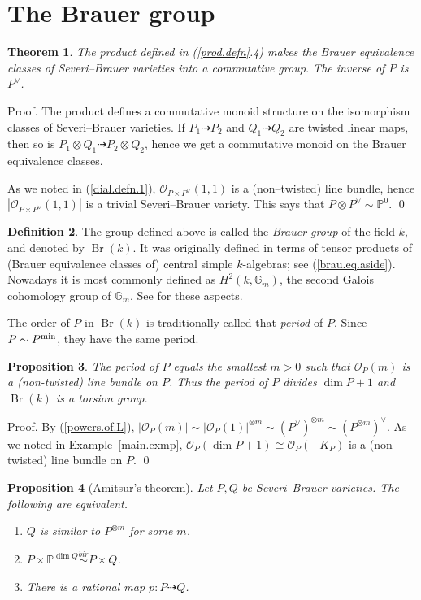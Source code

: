 \documentclass{amsart}
\newtheorem{thm}{Theorem}%
\newtheorem{prop}[thm]{Proposition}
\theoremstyle{definition}
\newtheorem{defn}[thm]{Definition}
\theoremstyle{remark}
\renewcommand{\o}[0]{{\mathcal O}}
\newcommand{\p}[0]{{\mathbb P}}
\newcommand{\map}[0]{\dasharrow}
\newcommand{\br}[0]{\operatorname{Br}}
\newcommand{\gm}[0]{{\mathbb G}_m}
\newcommand{\simb}[0]{\stackrel{bir}{\sim}}
\begin{document}
\section{The Brauer group}\label{sec.7}

\begin{thm}  The product defined in (\ref{prod.defn}.4) makes the
Brauer equivalence classes of Severi--Brauer varieties into a commutative group. The inverse of $P$ is $P^{\vee}$.
\end{thm}

Proof. The  product defines a commutative monoid structure on
the isomorphism classes of Severi--Brauer varieties.
If  $P_1\map P_2$ and $Q_1\map Q_2$ are twisted linear maps, then so is
$P_1\otimes Q_1\map P_2\otimes Q_2$, hence  we get a
commutative monoid on the Brauer equivalence classes.

As we noted in (\ref{dial.defn.1}), 
$\o_{P\times P^{\vee}}(1,1)$ is a (non--twisted) line bundle, hence
$|\o_{P\times P^{\vee}}(1,1)|$  is a trivial Severi--Brauer variety.
This says that 
 $P\otimes P^{\vee}\sim \p^0$. \qed


\begin{defn} \label{br.gp.defn}
The group defined above is  called the {\it Brauer group} of the field $k$, and denoted by $\br(k)$.   It was originally defined in terms of
tensor products of (Brauer equivalence classes of)
central simple $k$-algebras; see (\ref{brau.eq.aside}). Nowadays it is most commonly defined as
$H^2(k, \gm)$, the second Galois cohomology group of $\gm$. 
See  \cite{MR2266528} for these aspects.

The order of $P$ in
$\br(k)$ is traditionally called that {\it period} of $P$.
Since $P\sim P^{\rm min}$, they have the same period.
\end{defn}

\begin{prop}\label{period.prop} The period of $P$ equals the smallest  $m>0$
such that  $\o_P(m)$ is a (non-twisted) line bundle on $P$.
Thus  the period of $P$ divides  $\dim P+1$ and $\br(k)$ is a torsion group. 
\end{prop}

Proof. By (\ref{powers.of.L}), $|\o_P(m)|\sim |\o_P(1)|^{\otimes m}
\sim(P^{\vee})^{\otimes m}\sim(P^{\otimes m})^{\vee}$. 
As we noted in Example~\ref{main.exmp}, $\o_P(\dim P+1)\cong \o_P(-K_P)$
is a (non-twisted) line bundle on $P$. 
\qed



\begin{prop}[Amitsur's theorem]\label{ami.cor}
 Let $P, Q$ be Severi--Brauer varieties. 
The following are equivalent.
\begin{enumerate}
\item $Q$ is similar to
$P^{\otimes m}$ for some $m$.
\item $P\times \p^{\dim Q}\simb P\times  Q$.
\item There is a rational map  $p:P\map Q$.
\end{enumerate}
\end{prop}
\end{document}
